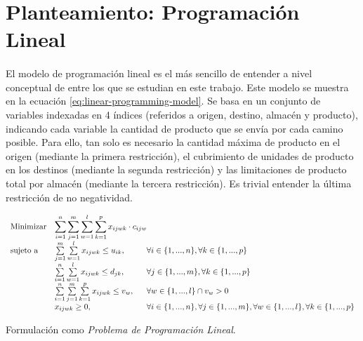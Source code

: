 \documentclass{article}
\begin{document}
  \section{Planteamiento: Programación Lineal}
  \label{section:linear-programming}

    \paragraph{}
    El modelo de programación lineal es el más sencillo de entender a nivel conceptual de entre los que se estudian en este trabajo. Este modelo se muestra en la ecuación \eqref{eq:linear-programming-model}. Se basa en un conjunto de variables indexadas en 4 índices (referidos a origen, destino, almacén y producto), indicando cada variable la cantidad de producto que se envía por cada camino posible. Para ello, tan solo es necesario la cantidad máxima de producto en el origen (mediante la primera restricción), el cubrimiento de unidades de producto en los destinos (mediante la segunda restricción) y las limitaciones de producto total por almacén (mediante la tercera restricción). Es trivial entender la última restricción de no negatividad.

    \begin{eqfloat}
      \begin{equation}
        \begin{array}{ll@{}ll}
          \text{Minimizar}	& \displaystyle \sum\limits_{i=1}^{n}\sum\limits_{j=1}^{m}\sum\limits_{w=1}^{l}\sum\limits_{k=1}^{p} x_{ijwk} \cdot c_{ijw} \\
          \text{sujeto a}		& \sum\limits_{j=1}^{m}\sum\limits_{w=1}^{l} x_{ijwk}	\leq u_{ik}, 		& \forall i \in \{1,...,n\}, \forall k \in \{1,...,p\}\\
                            &	\sum\limits_{i=1}^{n}\sum\limits_{w=1}^{l} x_{ijwk}	\leq d_{jk}, 		& \forall j \in \{1,...,m\}, \forall k \in \{1,...,p\}\\
                            &	\sum\limits_{i=1}^{n}\sum\limits_{j=1}^{m}\sum\limits_{k=1}^{p} x_{ijwk}	\leq v_{w}, 		& \forall w \in \{1,...,l\}  \cap v_{w} > 0 \\
                            & x_{ijwk}	\geq 0, 	& \forall i \in \{1,...,n\}, \forall j \in \{1,...,m\}, \forall w \in \{1,...,l\}, \forall k \in \{1,...,p\}
        \end{array}
      \end{equation}
      \caption{Formulación como \emph{Problema de Programación Lineal}.}
      \label{eq:linear-programming-model}
    \end{eqfloat}
\end{document}
